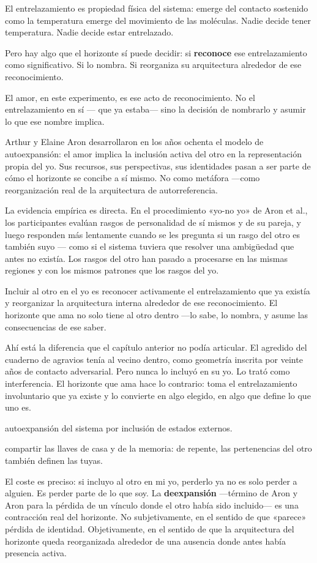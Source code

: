 El entrelazamiento es propiedad física del sistema: emerge del contacto sostenido como la temperatura emerge del movimiento de las moléculas. Nadie decide tener temperatura. Nadie decide estar entrelazado.

Pero hay algo que el horizonte sí puede decidir: si \textbf{reconoce} ese entrelazamiento como significativo. Si lo nombra. Si reorganiza su arquitectura alrededor de ese reconocimiento.

El amor, en este experimento, es ese acto de reconocimiento. No el entrelazamiento en sí — que ya estaba— sino la decisión de nombrarlo y asumir lo que ese nombre implica.

\noindent Arthur y Elaine Aron desarrollaron en los años ochenta el modelo de autoexpansión: el amor implica la inclusión activa del otro en la representación propia del yo. Sus recursos, sus perspectivas, sus identidades pasan a ser parte de cómo el horizonte se concibe a sí mismo. No como metáfora —como reorganización real de la arquitectura de autorreferencia.

La evidencia empírica es directa. En el procedimiento «yo-no yo» de Aron et al., los participantes evalúan rasgos de personalidad de sí mismos y de su pareja, y luego responden más lentamente cuando se les pregunta si un rasgo del otro es también suyo — como si el sistema tuviera que resolver una ambigüedad que antes no existía. Los rasgos del otro han pasado a procesarse en las mismas regiones y con los mismos patrones que los rasgos del yo.

Incluir al otro en el yo es reconocer activamente el entrelazamiento que ya existía y reorganizar la arquitectura interna alrededor de ese reconocimiento. El horizonte que ama no solo tiene al otro dentro —lo sabe, lo nombra, y asume las consecuencias de ese saber.

Ahí está la diferencia que el capítulo anterior no podía articular. El agredido del cuaderno de agravios tenía al vecino dentro, como geometría inscrita por veinte años de contacto adversarial. Pero nunca lo incluyó en su yo. Lo trató como interferencia. El horizonte que ama hace lo contrario: toma el entrelazamiento involuntario que ya existe y lo convierte en algo elegido, en algo que define lo que uno es.

\begin{fisica}
 autoexpansión del sistema por inclusión de estados externos.

 compartir las llaves de casa y de la memoria: de repente, las pertenencias del otro también definen las tuyas.
\end{fisica}
\noindent El coste es preciso: si incluyo al otro en mi yo, perderlo ya no es solo perder a alguien. Es perder parte de lo que soy. La \textbf{deexpansión} —término de Aron y Aron para la pérdida de un vínculo donde el otro había sido incluido— es una contracción real del horizonte. No subjetivamente, en el sentido de que «parece» pérdida de identidad. Objetivamente, en el sentido de que la arquitectura del horizonte queda reorganizada alrededor de una ausencia donde antes había presencia activa.


